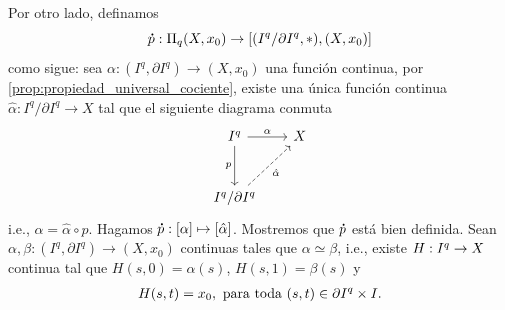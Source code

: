 Por otro lado, definamos $$\bdot{p}:\Pi_q(X,x_0)\to[(I^q/\pIq,*),(X,x_0)]$$ como sigue: sea $\alpha:(I^q,\partial I^q)\to (X,x_0)$ una función continua, por \ref{prop:propiedad_universal_cociente}, existe una única función continua $\hat{\alpha}:I^q/\partial I^q\to X$ tal que el siguiente diagrama conmuta
\[
\begin{tikzcd}[column sep=0.65cm, row sep=1cm] 
        I^q\arrow[r,"\alpha"] \arrow[d,"p"'] & X\\
        I^q/\partial I^q \arrow[ur, dashed, "\hat{\alpha}"']
\end{tikzcd}
\]
i.e., $\alpha=\hat{\alpha}\circ p$. Hagamos $\bdot{p}:[\alpha]\mapsto[\hat{\alpha}]$. Mostremos que $\p$ está bien definida. Sean $\alpha,\beta:(I^q,\partial I^q)\to (X,x_0)$ continuas tales que $\alpha\simeq \beta$, i.e., existe $H:I^{q}\to X$ continua tal que $ H(s,0)=\alpha(s)$, $H(s,1)=\beta(s)$ y
\begin{align*}
   H(s,t)=x_0, \text{ para toda } (s,t)\in\partial I^{q}\times I.
\end{align*}

